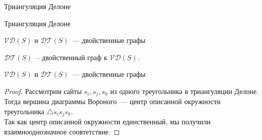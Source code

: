 \documentclass[12pt,aspectratio=169,svgnames]{beamer}
\begin{document}
    \begin{frame}{Триангуляция Делоне}
         \vspace{2mm}
         \begin{center}


        \end{center}

    \end{frame}

    \begin{frame}{Триангуляция Делоне}
         \vspace{2mm}
         \begin{center}


        \end{center}

    \end{frame}

    \begin{frame}{$\mathcal{V}\mathcal{D}(S)$ и $\mathcal{D}\mathcal{T}(S)$~--- двойственные графы}

        \vspace{2mm}

        \begin{thm}

            $\mathcal{D}\mathcal{T}(S)$~-- двойственный граф к $\mathcal{V}\mathcal{D}(S)$.

        \end{thm}

        \begin{center}


        \end{center}

    \end{frame}

    \begin{frame}{$\mathcal{V}\mathcal{D}(S)$ и $\mathcal{D}\mathcal{T}(S)$~--- двойственные графы}

        \begin{proof}

            Рассмотрим сайты $s_i, s_j, s_k$ из одного треугольника в триангуляции Делоне. Тогда вершина диаграммы Вороного~---
            центр описанной окружности треугольника $\triangle s_i s_j s_k$.\\

            Так как центр описанной окружности единственный, мы получили взаимнооднозначное соовтетствие.

        \end{proof}

    \end{frame}
\end{document}
